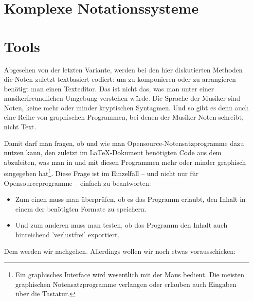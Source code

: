 \documentclass[
  DIV=calc,
  BCOR=5mm,
  11pt,
  headings=small,
  oneside,
  abstract=true,
  toc=bib,
  english,ngerman]{scrartcl}
\begin{document}




\section{Komplexe Notationssysteme}











 


\section{Tools}

Abgesehen von der letzten Variante, werden bei den hier diskutierten Methoden
die Noten zuletzt textbasiert codiert: um zu komponieren oder zu arrangieren
benötigt man einen Texteditor. Das ist nicht das, was man unter einer
musikerfreundlichen Umgebung verstehen würde. Die Sprache der Musiker sind
Noten, keine mehr oder minder kryptischen Syntagmen. Und so gibt es denn auch
eine Reihe von graphischen Programmen, bei denen der Musiker Noten schreibt,
nicht Text.

Damit darf man fragen, ob und wie man Opensource-Notensatzprogramme dazu nutzen
kann, den zuletzt im \LaTeX-Dokument benötigten Code aus dem abzuleiten, was man
in und mit diesen Programmen mehr oder minder graphisch eingegeben
hat\footnote{Ein graphisches Interface wird wesentlich mit der Maus bedient.
Die meisten graphischen Notensatzprogramme verlangen oder erlauben auch Eingaben
über die Tastatur.}. Diese Frage ist im Einzelfall -- und nicht nur für
Opensourceprogramme -- einfach zu beantworten:

\begin{itemize}
\item Zum einen muss man überprüfen, ob es das Programm erlaubt, den Inhalt in
einem der benötigten Formate zu speichern.
\item Und zum anderen muss man testen, ob das Programm den Inhalt auch
hinreichend 'verlustfrei' exportiert.
\end{itemize}

Dem werden wir nachgehen. Allerdings wollen wir noch etwas vorausschicken:
\end{document}
